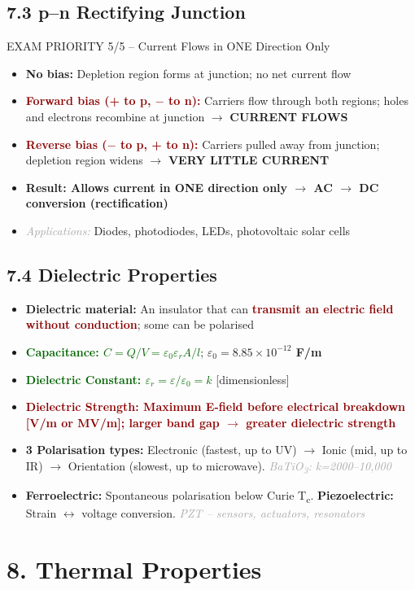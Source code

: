 \documentclass[11pt,a4paper]{article}
\newcommand{\mysec}[1]{\section*{#1}}
\newcommand{\mysubsec}[1]{\subsection*{#1}}
\newcommand{\CRIT}[1]{\textcolor{DarkRed}{\textbf{#1}}}
\newcommand{\KEY}[1]{\textcolor{SecondaryDark}{\textbf{#1}}}
\newcommand{\FML}[1]{\textcolor{DarkGreen}{\textbf{#1}}}
\newcommand{\EXA}[1]{\textcolor{DarkGray}{\textit{#1}}}
\newcommand{\HI}[1]{\colorbox{yellow!20}{\textcolor{DarkPurple}{\textbf{#1}}}}
\begin{document}
\mysubsec{7.3 p--n Rectifying Junction}
\begin{critbox}{EXAM PRIORITY 5/5 -- Current Flows in ONE Direction Only}
\begin{itemize}[leftmargin=*,nosep]
    \item \textbf{No bias:} Depletion region forms at junction; no net current flow
    \item \CRIT{Forward bias (+ to p, $-$ to n):} Carriers flow through both regions; holes and electrons recombine at junction $\to$ \textbf{CURRENT FLOWS}
    \item \CRIT{Reverse bias ($-$ to p, + to n):} Carriers pulled away from junction; depletion region widens $\to$ \textbf{VERY LITTLE CURRENT}
    \item \HI{Result: Allows current in ONE direction only $\to$ AC $\to$ DC conversion (rectification)}
    \item \EXA{Applications:} Diodes, photodiodes, LEDs, photovoltaic solar cells
\end{itemize}
\end{critbox}

\mysubsec{7.4 Dielectric Properties}
\begin{itemize}[leftmargin=*,nosep]
    \item \KEY{Dielectric material:} An insulator that can \CRIT{transmit an electric field without conduction}; some can be polarised
    \item \FML{Capacitance: $C = Q/V = \varepsilon_0\varepsilon_r A/l$}; \HI{$\varepsilon_0 = 8.85\times10^{-12}$ F/m}
    \item \FML{Dielectric Constant: $\varepsilon_r = \varepsilon/\varepsilon_0 = k$} [dimensionless]
    \item \CRIT{\textbf{Dielectric Strength:} Maximum E-field before electrical breakdown [V/m or MV/m]; \HI{larger band gap $\to$ greater dielectric strength}}
    \item \textbf{3 Polarisation types:} Electronic (fastest, up to UV) $\to$ Ionic (mid, up to IR) $\to$ Orientation (slowest, up to microwave). \EXA{BaTiO\textsubscript{3}: k=2000--10,000}
    \item \KEY{Ferroelectric:} Spontaneous polarisation below Curie T\textsubscript{c}. \KEY{Piezoelectric:} Strain $\leftrightarrow$ voltage conversion. \EXA{PZT -- sensors, actuators, resonators}
\end{itemize}

\newpage
\mysec{8. Thermal Properties}
\end{document}
